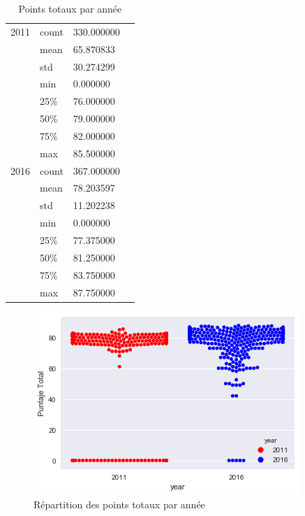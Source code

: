 \begin{table}[H]
	\centering
	\caption{Points totaux par année}
	\label{YearlyPuntajeTotal}
	\begin{tabular}{llll}
		2011 & count & 330.000000 &  \\
		&mean & 65.870833 &    \\
		&std & 30.274299 &    \\
		&min & 0.000000 &    \\
		&25\% & 76.000000 &    \\
		&50\% & 79.000000 &    \\
		&75\% & 82.000000 &    \\
		&max & 85.500000 &    \\
		2016 & count & 367.000000   \\
		&mean & 78.203597 &    \\
		&std & 11.202238 &    \\
		&min & 0.000000 &    \\
		&25\% & 77.375000 &    \\
		&50\% & 81.250000 &    \\
		&75\% & 83.750000 &    \\
		&max & 87.750000& 
	\end{tabular}
\end{table}




\begin{figure}[H]
	\centering
	\includegraphics[width=0.7\linewidth]{img/Exploration/PointTotauxEtc}
	\caption{Répartition des points totaux par année}
	\label{fig:pointtotauxetc}
\end{figure}

\newpage
